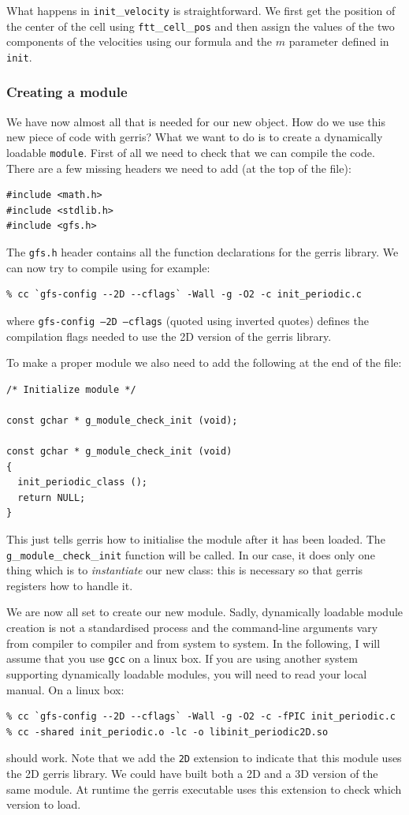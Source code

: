 \documentclass[a4paper]{article}
\begin{document}
What happens in {\tt init}\_{\tt velocity} is straightforward. We first get
the position of the center of the cell using {\tt ftt}\_{\tt cell}\_{\tt pos} and
then assign the values of the two components of the velocities using
our formula and the $m$ parameter defined in {\tt init}.

\subsubsection{Creating a module}

We have now almost all that is needed for our new object. How do we
use this new piece of code with gerris? What we want to do is to
create a dynamically loadable {\tt module}. First of all we need to
check that we can compile the code. There are a few missing headers we
need to add (at the top of the file):
\begin{verbatim}
#include <math.h>
#include <stdlib.h>
#include <gfs.h>

\end{verbatim}
The {\tt gfs.h} header contains all the function declarations for the
gerris library. We can now try to compile using for example:
\begin{verbatim}
% cc `gfs-config --2D --cflags` -Wall -g -O2 -c init_periodic.c
\end{verbatim}
where {\tt gfs-config --2D --cflags} (quoted using inverted quotes)
defines the compilation flags needed to use the 2D version of the
gerris library.

To make a proper module we also need to add the following at the end
of the file:
\begin{verbatim}
/* Initialize module */

const gchar * g_module_check_init (void);

const gchar * g_module_check_init (void)
{
  init_periodic_class ();
  return NULL;
}
\end{verbatim}
This just tells gerris how to initialise the module after it has been
loaded. The {\tt g}\_{\tt module}\_{\tt check}\_{\tt init} function
will be called. In our case, it does only one thing which is to {\em
instantiate} our new class: this is necessary so that gerris registers
how to handle it.

We are now all set to create our new module. Sadly, dynamically
loadable module creation is not a standardised process and the
command-line arguments vary from compiler to compiler and from system
to system. In the following, I will assume that you use {\tt gcc} on a
linux box. If you are using another system supporting dynamically
loadable modules, you will need to read your local manual. On a linux
box:
\begin{verbatim}
% cc `gfs-config --2D --cflags` -Wall -g -O2 -c -fPIC init_periodic.c
% cc -shared init_periodic.o -lc -o libinit_periodic2D.so
\end{verbatim}
should work. Note that we add the {\tt 2D} extension to indicate that
this module uses the 2D gerris library. We could have built both a 2D
and a 3D version of the same module. At runtime the gerris executable
uses this extension to check which version to load.
\end{document}
